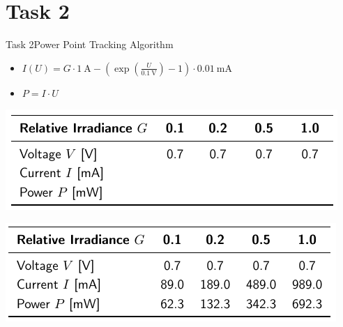 
\section{Task 2}

\setcounter{task}{1}

\begin{frame}[allowframebreaks]{Task 2}{Power Point Tracking Algorithm}
  \begin{requirementsnoinc}
    \begin{itemize}
      \item $I(U)=G \cdot 1 \mathrm{~A}-\left(\exp \left(\frac{U}{0.1 \mathrm{~V}}\right)-1\right) \cdot 0.01 \mathrm{~mA}$
      \item $P = I \cdot U$
    \end{itemize}
  \end{requirementsnoinc}
  \begin{solutionnoinc}
    \centering
    \includegraphics[width=\textwidth]{./figures/task2_sol1_empty.png}
  \end{solutionnoinc}
  \framebreak
  \begin{solution}
    \centering
    \includegraphics[width=\textwidth]{./figures/task2_sol1.png}
  \end{solution}
\end{frame}

